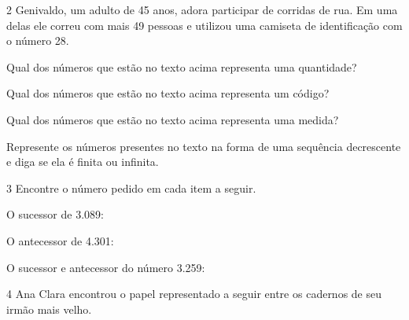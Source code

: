 \num{2} Genivaldo, um adulto de 45 anos, adora participar de corridas de
rua. Em uma delas ele correu com mais 49 pessoas e utilizou uma camiseta
de identificação com o número 28.

\begin{escolha}
\item
  Qual dos números que estão no texto acima representa uma
  quantidade?\\

\item
  Qual dos números que estão no texto acima representa um
  código?\\

\item
  Qual dos números que estão no texto acima representa uma
  medida?\\

\item
  Represente os números presentes no texto na forma de uma sequência
  decrescente e diga se ela é finita ou infinita.\\
\end{escolha}

\num{3} Encontre o número pedido em cada item a seguir.

\begin{escolha}
\item
  O sucessor de 3.089: 
\item
  O antecessor de 4.301: 
\item
  O sucessor e antecessor do número 3.259: 
\end{escolha}


\pagebreak
\num{4} Ana Clara encontrou o papel representado a seguir entre os cadernos de seu irmão mais velho.

